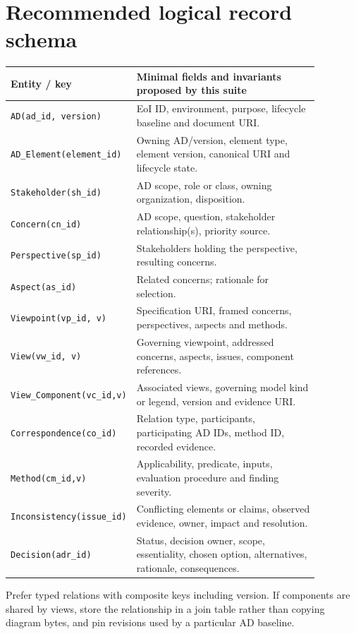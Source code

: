 \documentclass[11pt,letterpaper]{article}
\begin{document}
\section{Recommended logical record schema}
\small
\begin{longtable}{p{0.26\linewidth}p{0.61\linewidth}}\toprule\textbf{Entity / key}&\textbf{Minimal fields and invariants proposed by this suite}\\\midrule\endhead
\texttt{AD(ad\_id, version)}&EoI ID, environment, purpose, lifecycle baseline and document URI.\\
\texttt{AD\_Element(element\_id)}&Owning AD/version, element type, element version, canonical URI and lifecycle state.\\
\texttt{Stakeholder(sh\_id)}&AD scope, role or class, owning organization, disposition.\\
\texttt{Concern(cn\_id)}&AD scope, question, stakeholder relationship(s), priority source.\\
\texttt{Perspective(sp\_id)}&Stakeholders holding the perspective, resulting concerns.\\
\texttt{Aspect(as\_id)}&Related concerns; rationale for selection.\\
\texttt{Viewpoint(vp\_id, v)}&Specification URI, framed concerns, perspectives, aspects and methods.\\
\texttt{View(vw\_id, v)}&Governing viewpoint, addressed concerns, aspects, issues, component references.\\
\texttt{View\_Component(vc\_id,v)}&Associated views, governing model kind or legend, version and evidence URI.\\
\texttt{Correspondence(co\_id)}&Relation type, participants, participating AD IDs, method ID, recorded evidence.\\
\texttt{Method(cm\_id,v)}&Applicability, predicate, inputs, evaluation procedure and finding severity.\\
\texttt{Inconsistency(issue\_id)}&Conflicting elements or claims, observed evidence, owner, impact and resolution.\\
\texttt{Decision(adr\_id)}&Status, decision owner, scope, essentiality, chosen option, alternatives, rationale, consequences.\\\bottomrule\end{longtable}
\normalsize
\begin{Guidance}Prefer typed relations with composite keys including version. If components are shared by views, store the relationship in a join table rather than copying diagram bytes, and pin revisions used by a particular AD baseline.\end{Guidance}
\end{document}
